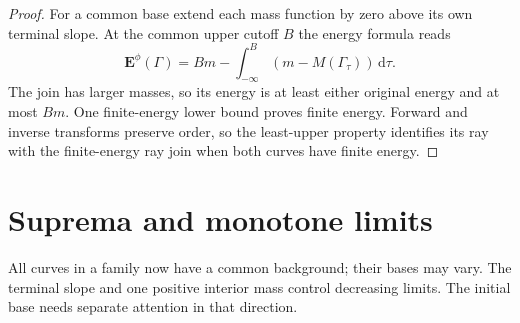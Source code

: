 \begin{proof}
For a common base extend each mass function by zero above its own terminal slope. At the common upper cutoff $B$ the energy formula reads
\[
 \mathbf E^\phi(\Gamma)=Bm-
                  \int_{-\infty}^B(m-M(\Gamma_\tau))\,\mathrm d\tau.
\]
The join has larger masses, so its energy is at least either original energy and at most $Bm$. One finite-energy lower bound proves finite energy. Forward and inverse transforms preserve order, so the least-upper property identifies its ray with the finite-energy ray join when both curves have finite energy.
\end{proof}

\section{Suprema and monotone limits}
\label{sec:test-curve-monotone-limits}
All curves in a family now have a common background; their bases may vary. The terminal slope and one positive interior mass control decreasing limits. The initial base needs separate attention in that direction.

